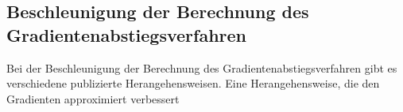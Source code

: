 \subsection{Beschleunigung der Berechnung des Gradientenabstiegsverfahren}\label{sec:grad}

Bei der Beschleunigung der Berechnung des Gradientenabstiegsverfahren gibt es verschiedene publizierte Herangehensweisen. 
Eine Herangehensweise, die den Gradienten approximiert verbessert 


